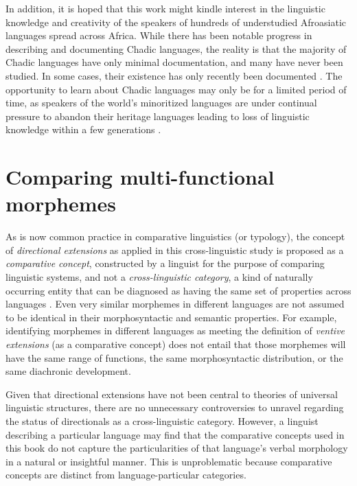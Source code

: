 In addition, it is hoped that this work might kindle interest in the linguistic knowledge and creativity of the speakers of hundreds of understudied Afroasiatic languages spread across Africa. While there has been notable progress in describing and documenting Chadic languages, the reality is that the majority of Chadic languages have only minimal documentation, and many have never been studied. In some cases, their existence has only recently been documented \citep{blenchFiveUnexpectedChadic2016,blenchNewApproachesWest2017}. The opportunity to learn about Chadic languages may only be for a limited period of time, as speakers of the world's minoritized languages are under continual pressure to abandon their heritage languages leading to loss of linguistic knowledge within a few generations \citep{bromhamGlobalPredictorsLanguage2021,campbellNewKnowledgeFindings2013,simonsTwoCenturiesSpreading2019}.

\section{Comparing multi-functional morphemes} \label{sec:comparing}

As is now common practice in comparative linguistics (or typology), the concept of \textit{directional extensions} as applied in this cross-linguistic study is proposed as a \textit{comparative concept}, constructed by a linguist for the purpose of comparing linguistic systems, and not a \textit{cross-linguistic category}, a kind of naturally occurring entity that can be diagnosed as having the same set of properties across languages \citep{haspelmathPreestablishedCategoriesDont2007, haspelmathComparativeConceptsDescriptive2010}. Even very similar morphemes in different languages are not assumed to be identical in their morphosyntactic and semantic properties. For example, identifying morphemes in different languages as meeting the definition of \textit{ventive extensions} (as a comparative concept) does not entail that those morphemes will have the same range of functions, the same morphosyntactic distribution, or the same diachronic development. 

Given that directional extensions have not been central to theories of universal linguistic structures, there are no unnecessary controversies to unravel regarding the status of directionals as a cross-linguistic category. However, a linguist describing a particular language may find that the comparative concepts used in this book do not capture the particularities of that language's verbal morphology in a natural or insightful manner. This is unproblematic because comparative concepts are distinct from language-particular categories. 

